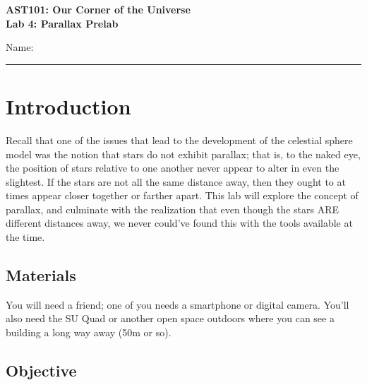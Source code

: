 \documentclass[11pt]{article}
\begin{document}
\begin{center}
\textbf{\Large
AST101: Our Corner of the Universe \\
\vspace*{0.1cm}
Lab 4: Parallax Prelab
}
\end{center}

\vspace*{0.5cm}

{\Large Name:}\vspace*{0.5cm}\\\hrule
\vspace*{0.5cm}

\section{Introduction}

Recall that one of the issues that lead to the development of the celestial sphere model was the notion that stars do not exhibit parallax; that is, to the naked eye, the position of stars relative to one another never appear to alter in even the slightest. If the stars are not all the same distance away, then they ought to at times appear closer together or farther apart. This lab will explore the concept of parallax, and culminate with the realization that even though the stars ARE different distances away, we never could've found this with the tools available at the time. 

\subsection*{Materials}

You will need a friend; one of you needs a smartphone or digital camera. You'll also need the SU Quad or another open space outdoors where you can see a building a long way away (50m or so).

\subsection*{Objective}
\end{document}
